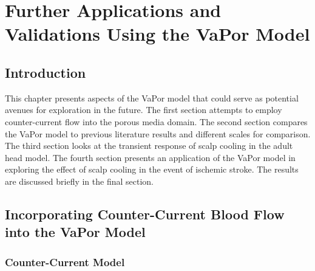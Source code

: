 \documentclass[11pt,english,a4paper,twoside,openright]{report}
\begin{document}
{{{{{{{\newpage
\thispagestyle{empty}
\chapter[Further Applications and Validations Using the VaPor Model]{{\Huge F}urther {\Huge A}pplications and {\Huge V}alidations {\Huge U}sing the {\Huge V}a{\Huge P}or {\Huge M}odel}
\thispagestyle{empty}
\label{Sec:5Chapter5}

\section[Introduction]{{\Large I}ntroduction}

This chapter presents aspects of the VaPor model that could serve as potential avenues for exploration in the future. The first section attempts to employ counter-current flow into the porous media domain. The second section compares the VaPor model to previous literature results and different scales for comparison. The third section looks at the transient response of scalp cooling in the adult head model. The fourth section presents an application of the VaPor model in exploring the effect of scalp cooling in the event of ischemic stroke. The results are discussed briefly in the final section. 

\section[Incorporating Counter-Current Blood Flow into the VaPor Model]{{\Large I}ncorporating {\Large C}ounter-{\Large C}urrent {\Large B}lood {\Large F}low into the {\Large V}a{\Large P}or {\Large M}odel}

\subsection{Counter-Current Model}

}}}}}}}
\end{document}
